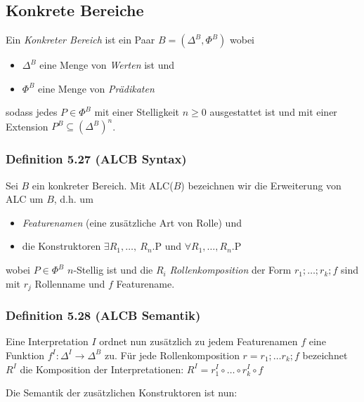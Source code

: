 \subsection{Konkrete Bereiche}\label{konkrete-bereiche}

Ein \emph{Konkreter Bereich} ist ein Paar $B = (\Delta^{B},\Phi^{B})$
wobei

\begin{itemize}
\item
  $\Delta^{B}$ eine Menge von \emph{Werten} ist und
\item
  $\Phi^{B}$ eine Menge von \emph{Prädikaten}
\end{itemize}

sodass jedes $P \in \Phi^{B}$ mit einer Stelligkeit $n \geq 0$
ausgestattet ist und mit einer Extension
$P^{B} \subseteq \left( \Delta^{B} \right)^{n}$.

\subsubsection{Definition 5.27 (ALCB
Syntax)}\label{definition-5.27-alcb-syntax}

Sei $B$ ein konkreter Bereich. Mit ALC($B$) bezeichnen wir die
Erweiterung von ALC um $B$, d.h. um

\begin{itemize}
\item
  \emph{Featurenamen} (eine zusätzliche Art von Rolle) und
\item
  die Konstruktoren $\exists R_{1},\ldots,\ R_{n}\text{.P}$ und
  $\forall R_{1},\ldots,R_{n}\text{.P}$
\end{itemize}

wobei $P \in \Phi^{B}$ $n$-Stellig ist und die $R_{i}$
\emph{Rollenkomposition} der Form $r_{1};\ldots;r_{k};f$ sind mit
$r_{j}$ Rollenname und $f$ Featurename.

\subsubsection{Definition 5.28 (ALCB
Semantik)}\label{definition-5.28-alcb-semantik}

Eine Interpretation $I$ ordnet nun zusätzlich zu jedem Featurenamen
$f$ eine Funktion $f^{I}:\Delta^{I} \rightarrow \Delta^{B}$ zu. Für
jede Rollenkomposition $r = r_{1};\ldots r_{k};f$ bezeichnet $R^{I}$
die Komposition der Interpretationen:
$R^{I} = r_{1}^{I} \circ \ldots \circ r_{k}^{I} \circ f$

Die Semantik der zusätzlichen Konstruktoren ist nun:

